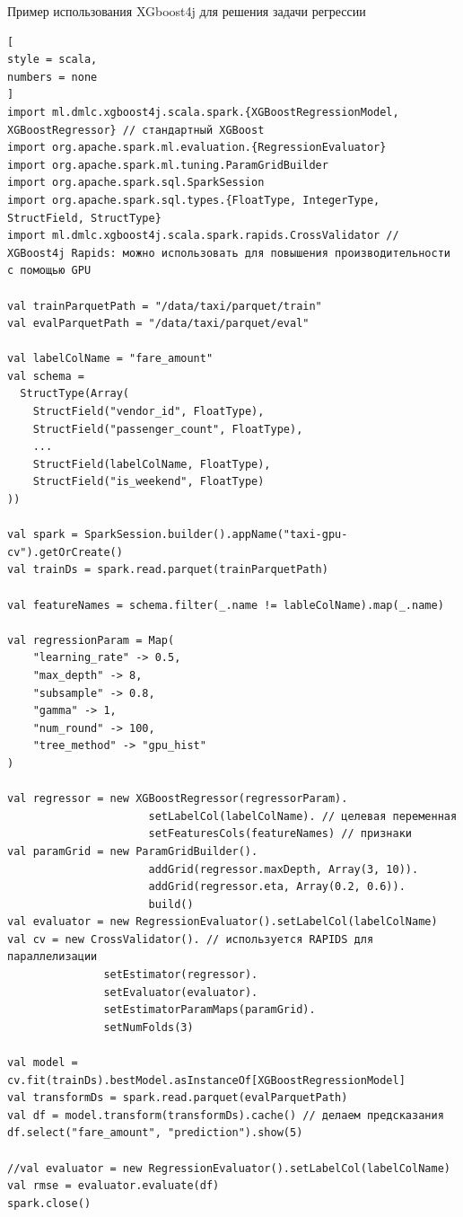 \documentclass[%
	11pt,
	a4paper,
	utf8,
		]{article}
\begin{document}
Пример использования XGboost4j для решения задачи регрессии
\begin{lstlisting}[
style = scala,
numbers = none
]
import ml.dmlc.xgboost4j.scala.spark.{XGBoostRegressionModel, XGBoostRegressor} // стандартный XGBoost
import org.apache.spark.ml.evaluation.{RegressionEvaluator}
import org.apache.spark.ml.tuning.ParamGridBuilder
import org.apache.spark.sql.SparkSession
import org.apache.spark.sql.types.{FloatType, IntegerType, StructField, StructType}
import ml.dmlc.xgboost4j.scala.spark.rapids.CrossValidator // XGBoost4j Rapids: можно использовать для повышения производительности с помощью GPU

val trainParquetPath = "/data/taxi/parquet/train"
val evalParquetPath = "/data/taxi/parquet/eval"

val labelColName = "fare_amount"
val schema = 
  StructType(Array(
    StructField("vendor_id", FloatType),
    StructField("passenger_count", FloatType),
    ...
    StructField(labelColName, FloatType),
    StructField("is_weekend", FloatType)
))

val spark = SparkSession.builder().appName("taxi-gpu-cv").getOrCreate()
val trainDs = spark.read.parquet(trainParquetPath)

val featureNames = schema.filter(_.name != lableColName).map(_.name)

val regressionParam = Map(
    "learning_rate" -> 0.5,
    "max_depth" -> 8,
    "subsample" -> 0.8,
    "gamma" -> 1,
    "num_round" -> 100,
    "tree_method" -> "gpu_hist"
)

val regressor = new XGBoostRegressor(regressorParam).
                      setLabelCol(labelColName). // целевая переменная
                      setFeaturesCols(featureNames) // признаки
val paramGrid = new ParamGridBuilder().
                      addGrid(regressor.maxDepth, Array(3, 10)).
                      addGrid(regressor.eta, Array(0.2, 0.6)).
                      build()
val evaluator = new RegressionEvaluator().setLabelCol(labelColName)
val cv = new CrossValidator(). // используется RAPIDS для параллелизации
               setEstimator(regressor).
               setEvaluator(evaluator).
               setEstimatorParamMaps(paramGrid).
               setNumFolds(3)
               
val model = cv.fit(trainDs).bestModel.asInstanceOf[XGBoostRegressionModel]
val transformDs = spark.read.parquet(evalParquetPath)
val df = model.transform(transformDs).cache() // делаем предсказания
df.select("fare_amount", "prediction").show(5)   

//val evaluator = new RegressionEvaluator().setLabelCol(labelColName)
val rmse = evaluator.evaluate(df)
spark.close()
\end{lstlisting}
\end{document}
